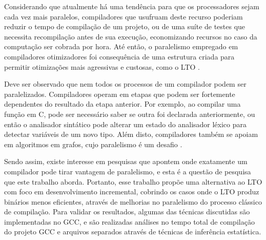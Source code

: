 Considerando que atualmente há uma tendência para que os processadores sejam
cada vez mais paralelos, compiladores que usufruam deste recurso poderiam
reduzir o tempo de compilação de um projeto, ou de uma suíte de testes que
necessita recompilação antes de sua execução, economizando recursos no caso da
computação ser cobrada por hora. Até então, o paralelismo empregado em compiladores
otimizadores foi consequência de uma estrutura criada para permitir otimizações
mais agressivas e custosas, como o LTO \citep{glek2010optimizing}.

Deve ser observado que nem todos os processos de um compilador podem ser
paralelizados. Compiladores operam em etapas que podem ser fortemente
dependentes do resultado da etapa anterior. Por exemplo, ao compilar uma
função em C, pode ser necessário saber se outra foi declarada anteriormente, ou
então o analisador sintático pode alterar um estado do analisador léxico para
detectar variáveis de um novo tipo. Além disto, compiladores também se apoiam em algoritmos
em grafos, cujo paralelismo é um desafio \citep{lumsdaine2007challenges}.

Sendo assim, existe interesse em pesquisas que apontem onde exatamente um compilador
pode tirar vantagem de paralelismo, e esta é a questão de pesquisa que este
trabalho aborda. Portanto, esse trabalho propõe uma alternativa ao LTO com foco
em desenvolvimento incremental, cobrindo os casos onde o LTO produz binários menos
eficientes, através de melhorias no paralelismo do processo clássico de compilação.
Para validar os resultados, algumas das técnicas discutidas são implementadas no
GCC, e são realizadas análises no tempo total de compilação do projeto GCC
e arquivos separados através de técnicas de inferência estatística.


